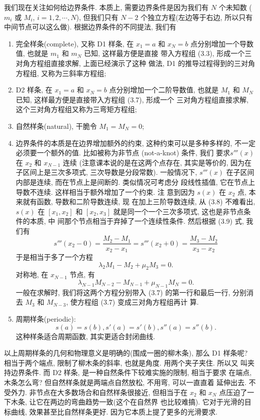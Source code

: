 \documentclass[a4paper]{ctexart}
\begin{document}
我们现在关注如何给边界条件. 本质上, 需要边界条件是因为我们有 $N$ 个未知数
($m_i$ 或 $M_i$, $i = 1, 2, \cdots, N$), 但我们只有 $N - 2$ 
个独立方程(左边等于右边, 所以只有中间节点可以这么做). 根据边界条件的不同提法, 
我们有

\begin{enumerate}
  \item 完全样条(complete), 又称 D1 样条, 在 $x_1 = a$ 和 $x_N = b$
    点分别增加一个导数值, 也就是 $m_1$ 和 $m_N$ 已知, 这样最方便是直接
    带入方程组 (3.3), 形成一个三对角方程组直接求解, 上面已经演示了这种
    做法, D1 的推导过程得到的三对角方程组, 又称为三斜率方程组;
  \item D2 样条, 在 $x_1 = a$ 和 $x_N = b$ 点分别增加一个二阶导数值,
    也就是 $M_1$ 和 $M_N$ 已知, 这样最方便是直接带入方程组 (3.7), 形成一个
    三对角方程组直接求解, 这个三对角方程组又称为三弯矩方程组;
  \item 自然样条(natural), 干脆令 $M_1 = M_N = 0$; 
  \item 边界条件的本质是在边界增加额外的约束, 这种约束可以是多种多样的,
    不一定必须要一个额外的值. 比如被称为非节点 (not-a-knot) 条件, 我们
    要求$s'''(x)$ 在 $x_2$ 和 $x_{N - 1}$ 连续 (注意课本说的是在这两个点存在, 
    其实是等价的, 因为在子区间上是三次多项式, 三次导数是分段常数). 
    一般情况下,
    $s'''(x)$ 在子区间内部是连续, 而在节点上是间断的. 类似情况可考虑分
    段线性插值, 它在节点上导数不连续. 这样相当于额外增加了一个约束. 注
    意到因为 $s(x)$ 在 $x_2$ 点, 本来就有函数, 导数和二阶导数连续, 现
    在加上三阶导数连续, 从 (3.8) 不难看出, $s(x)$ 在 $[x_1, x_2]$ 和
    $[x_2, x_3]$ 就是同一个一个三次多项式, 这也是非节点条件的本质, 中
    间那个节点相当于弃掉了一个连续性条件. 然后根据 (3.9) 式, 我们有
    $$
      s'''(x_2 - 0) = \frac{M_2 - M_1}{x_2 - x_1} =
      s'''(x_2 + 0) = \frac{M_3 - M_2}{x_3 - x_2}
    $$
    于是相当于多了一个方程
    $$
    \lambda_2 M_1 - M_2 + \mu_2 M_3 = 0.
    $$
    对称地, 在 $x_{N - 1}$ 节点, 有
    $$
    \lambda_{N - 1} M_{N - 2} - M_{N - 1} + \mu_{N - 1} M_{N} = 0.
    $$
    一般在求解时, 我们将这两个方程分别带入 (3.7) 的第一行和最后一行,
    分别消去 $M_3$ 和 $M_{N - 3}$, 使方程组 (3.7) 变成三对角方程组再计
    算. 
  \item 周期样条(periodic):
    $$
    s(a) = s(b), s'(a) = s'(b), s''(a) = s''(b).
    $$
    这种样条适合周期函数, 其实更适合封闭曲线. 
\end{enumerate}

以上周期样条的几何和物理意义是明确的(围成一圈的柳木条), 那么 D1 样条呢?
相当于两个端点, 限制了柳木条的斜率, 也就是角度. 用两个夹子夹住. 所以又
叫夹持边界条件. 而 D2 样条, 是一种自然条件下较难实施的限制, 相当于要求
在端点, 木条怎么弯? 但自然样条就是两端点自然放松, 不用弯, 可以一直直着
延伸出去. 不受外力. 非节点在大多数场合和自然样条很接近, 但相当于在
$x_2$ 和 $x_N$ 点压迫了一下木条, 让它在两边的弯曲趋势一致(这个在自然界
也比较难搞). 它对于光滑的目标曲线, 效果甚至比自然样条更好. 
因为它本质上提了更多的光滑要求. 
\end{document}
